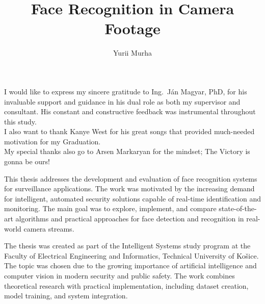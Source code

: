 \documentclass[]{tukethesis}
\author{Yurii Murha}
\title{Face Recognition in Camera Footage}
\subtitle{}
\begin{document}
\renewcommand\theHfigure{\theHsection.\arabic{figure}}
\renewcommand\theHtable{\theHsection.\arabic{table}}

\firstpage

\titlepage


\errata %
\kerrata

\abstrakte %


\endabstract %


\declaration

\acknowledgement %
I would like to express my sincere gratitude to Ing.~Ján Magyar, PhD, for his invaluable support and guidance in his dual role as both my supervisor and consultant. His constant and constructive feedback was instrumental throughout this study.
\\
I also want to thank Kanye West for his great songs that provided much-needed motivation for my Graduation.
\\ 
My special thanks also go to Arsen Markaryan for the mindset; 
The Victory is gonna be ours!
\endacknowledgement

\preface %
This thesis addresses the development and evaluation of face recognition systems for surveillance applications. The work was motivated by the increasing demand for intelligent, automated security solutions capable of real-time identification and monitoring. The main goal was to explore, implement, and compare state-of-the-art algorithms and practical approaches for face detection and recognition in real-world camera streams.

The thesis was created as part of the Intelligent Systems study program at the Faculty of Electrical Engineering and Informatics, Technical University of Košice. The topic was chosen due to the growing importance of artificial intelligence and computer vision in modern security and public safety. The work combines theoretical research with practical implementation, including dataset creation, model training, and system integration.
\end{document}

